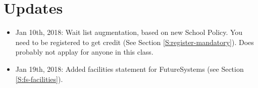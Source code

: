 
\chapter{Updates}

\begin{itemize}

\item Jan 10th, 2018:  Wait list augmentation, based on new School Policy. You need to be registered to get credit (See Section \ref{S:register-mandatory}). Does probably not applay for anyone in this class.

\item Jan 19th, 2018: Added facilities statement for FutureSystems (see Section \ref{S:fs-facilities}).
\end{itemize}
